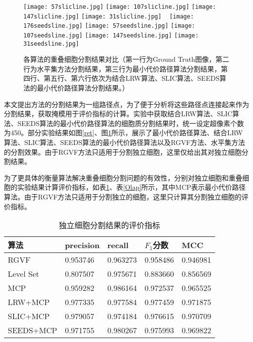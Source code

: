 \documentclass[nomlist,masters]{seuthesix}
\begin{document}
\begin{figure}[H]
\texttt{[image: 57slicline.jpg]}
\hspace{0.001\textwidth}
\texttt{[image: 107slicline.jpg]}
\hspace{0.001\textwidth}
\texttt{[image: 147slicline.jpg]}
\hspace{0.001\textwidth}
\texttt{[image: 31slicline.jpg]}
\vfill
\vspace{6pt}
\centering 
\texttt{[image: 176seedsline.jpg]}
\hspace{0.001\textwidth}
\texttt{[image: 57seedsline.jpg]}
\hspace{0.001\textwidth}
\texttt{[image: 107seedsline.jpg]}
\hspace{0.001\textwidth}
\texttt{[image: 147seedsline.jpg]}
\hspace{0.001\textwidth}
\texttt{[image: 31seedsline.jpg]}
\caption{各算法的重叠细胞分割结果对比（第一行为Ground Truth图像，第二行为水平集方法分割结果，第三行为最小代价路径算法分割结果，第四行、第五行、第六行依次为结合LRW算法、SLIC算法、SEEDS算法的最小代价路径算法分割结果。）}
\label{ret2}
\end{figure}

本文提出方法的分割结果为一组路径点，为了便于分析将这些路径点连接起来作为分割结果，获取掩模用于评价指标的计算。实验中获取结合LRW算法、SLIC算法、SEEDS算法的最小代价路径算法的细胞质分割结果时，统一设定超像素个数为450。部分实验结果如图\ref{ret}、图\ref{ret2}所示，展示了最小代价路径算法、结合LRW算法、SLIC算法、SEEDS算法的最小代价路径算法以及RGVF方法、水平集方法的分割效果。由于RGVF方法只适用于分割独立细胞，这里仅给出其对独立细胞分割结果。

为了更具体的衡量算法解决重叠细胞分割问题的有效性，分别对独立细胞和重叠细胞的实验结果计算评价指标，如表\ref{One}、表\ref{Olap}所示，其中MCP表示最小代价路径算法。由于RGVF方法只适用于分割独立的细胞，这里只计算其分割独立细胞的评价指标。

\begin{table}[H]
\centering
\caption{独立细胞分割结果的评价指标\label{One}}
\begin{tabular}{|p{3cm}<{\centering}|p{2cm}<{\centering}|p{2cm}<{\centering}|p{2cm}<{\centering}|p{2cm}<{\centering}|}
\hline
算法 & precision & recall & $F_{1}$分数 & MCC \\
\hline
RGVF & 0.953746 & 0.963273 & 0.958486 & 0.946981 \\
\hline
Level Set & 0.807507 & 0.975671 & 0.883660 & 0.856569 \\
\hline
MCP & 0.959282 & 0.986164 & 0.972537 & 0.965525 \\
\hline
LRW+MCP & 0.977335 & 0.977584 & 0.977459 & 0.971875 \\
\hline
SLIC+MCP & 0.979057 & 0.974184 & 0.976615 & 0.970709 \\
\hline
SEEDS+MCP & 0.971755 & 0.980267 & 0.975993 & 0.969822 \\
\hline
\end{tabular}
\end{table}
\end{document}
